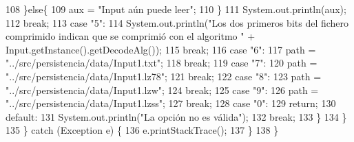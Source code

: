 \begin{DoxyCode}
108                         \}\textcolor{keywordflow}{else}\{
109                             aux = \textcolor{stringliteral}{"Input aún puede leer"};
110                         \}
111                         System.out.println(aux);
112                     \textcolor{keywordflow}{break};
113                     \textcolor{keywordflow}{case} \textcolor{stringliteral}{"5"}:
114                         System.out.println(\textcolor{stringliteral}{"Los dos primeros bits del fichero comprimido indican que se
       comprimió con el algoritmo "} + Input.getInstance().getDecodeAlg());
115                     \textcolor{keywordflow}{break};
116                     \textcolor{keywordflow}{case} \textcolor{stringliteral}{"6"}:
117                         path = \textcolor{stringliteral}{"../src/persistencia/data/Input1.txt"};
118                     \textcolor{keywordflow}{break};
119                     \textcolor{keywordflow}{case} \textcolor{stringliteral}{"7"}:
120                     path = \textcolor{stringliteral}{"../src/persistencia/data/Input1.lz78"};
121                     \textcolor{keywordflow}{break};
122                     \textcolor{keywordflow}{case} \textcolor{stringliteral}{"8"}:
123                     path = \textcolor{stringliteral}{"../src/persistencia/data/Input1.lzw"};
124                     \textcolor{keywordflow}{break};
125                     \textcolor{keywordflow}{case} \textcolor{stringliteral}{"9"}:
126                     path = \textcolor{stringliteral}{"../src/persistencia/data/Input1.lzss"};
127                     \textcolor{keywordflow}{break};
128                     \textcolor{keywordflow}{case} \textcolor{stringliteral}{"0"}:
129                         \textcolor{keywordflow}{return};
130                     \textcolor{keywordflow}{default}:
131                         System.out.println(\textcolor{stringliteral}{"La opción no es válida"});
132                     \textcolor{keywordflow}{break};
133                 \}
134             \}
135         \} \textcolor{keywordflow}{catch} (Exception e) \{
136             e.printStackTrace();
137         \}
138     \}
\end{DoxyCode}
\mbox{\label{classpersistencia_1_1input_1_1Driver____Input_a4f8a0f13847071d675771817ee212f2c}} 
